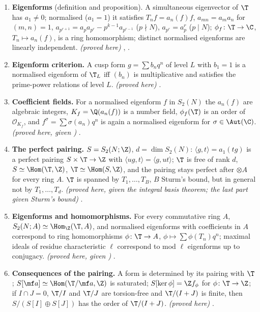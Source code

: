 \begin{enumerate}[label=\textbf{\thechapter.\arabic*}]
$\Z$-module of finite rank; $\T^{(N)}$ is the $\Z$-span of the $T_n$ with $(n,N)=1$. \emph{(proved here, given the integral basis theorem of )}
, .
\item \textbf{Eigenforms} (definition and proposition). A simultaneous eigenvector of $\T$ has $a_1\ne0$; normalised ($a_1=1$) it satisfies $T_nf=a_n(f)f$, $a_{mn}=a_ma_n$ for
$(m,n)=1$, $a_{p^{r+1}}=a_pa_{p^r}-p^{k-1}a_{p^{r-1}}$ ($p\nmid N$), $a_{p^r}=a_p^r$ ($p\mid N$); $\phi_f\colon\T\to\C$, $T_n\mapsto a_n(f)$, is a ring homomorphism; distinct normalised
eigenforms are linearly independent. \emph{(proved here)} , .
\item \textbf{Eigenform criterion.} A cusp form $g=\sum b_nq^n$ of level $L$ with $b_1=1$ is a normalised eigenform of $\T_L$ iff $(b_n)$ is multiplicative and satisfies the
prime-power relations of level $L$. \emph{(proved here)} .
\item \textbf{Coefficient fields.} For a normalised eigenform $f$ in $S_2(N)$ the $a_n(f)$ are algebraic integers, $K_f=\Q(a_n(f))$ is a number field, $\phi_f(\T)$ is an order of
$\mathcal O_{K_f}$, and $f^\sigma=\sum\sigma(a_n)q^n$ is again a normalised eigenform for $\sigma\in\Aut(\C)$. \emph{(proved here, given )}
.
\item \textbf{The perfect pairing.} $S=S_2(N;\Z)$, $d=\dim S_2(N)$: $\langle g,t\rangle=a_1(tg)$ is a perfect pairing $S\times\T\to\Z$ with $\langle ug,t\rangle=\langle g,ut\rangle$; $\T$ is free of rank
$d$, $S\simeq\Hom(\T,\Z)$, $\T\simeq\Hom(S,\Z)$, and the pairing stays perfect after $\otimes A$ for every ring $A$. $\T$ is spanned by $T_1,\dots,T_B$, $B$ Sturm's bound,
but in general not by $T_1,\dots,T_d$. \emph{(proved here, given the integral basis theorem; the last part given Sturm's bound)} .
\item \textbf{Eigenforms and homomorphisms.} For every commutative ring $A$, $S_2(N;A)\simeq\Hom_\Z(\T,A)$, and normalised eigenforms with coefficients in $A$ correspond to ring
homomorphisms $\phi\colon\T\to A$, $\phi\mapsto\sum\phi(T_n)q^n$; maximal ideals of residue characteristic $\ell$ correspond to mod $\ell$ eigenforms up to conjugacy.
\emph{(proved here, given )} .
\item \textbf{Consequences of the pairing.} A form is determined by its pairing with $\T$; $S[\mf a]\simeq\Hom(\T/\mf a,\Z)$ is saturated; $S[\ker\phi]=\Z f_\phi$ for $\phi\colon\T\to\Z$; if $I\cap J=0$, $\T/I$ and $\T/J$ are torsion-free and $\T/(I+J)$ is finite, then $S/(S[I]\oplus S[J])$ has the order of $\T/(I+J)$. \emph{(proved here)} .

\end{enumerate}
